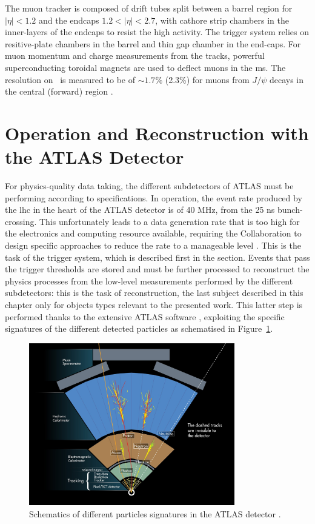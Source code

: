 The muon tracker is composed of drift tubes split between a barrel region for $|\eta| < 1.2$ and the endcaps $1.2 < |\eta| < 2.7$, with cathore strip chambers in the inner-layers of the endcaps to resist the high activity. The trigger system relies on resitive-plate chambers in the barrel and thin gap chamber in the end-caps. For muon momentum and charge measurements from the tracks, powerful superconducting toroidal magnets are used to deflect muons in the \gls{ms}. The resolution on \pt\ is measured to be of $\sim 1.7$\% (2.3\%) for muons from $J/\psi$ decays in the central (forward) region \cite{atlasMuonPTReco}.

\section{Operation and Reconstruction with the ATLAS Detector}
For physics-quality data taking, the different subdetectors of ATLAS must be performing according to specifications. In operation, the event rate produced by the \gls{lhc} in the heart of the ATLAS detector is of 40 MHz, from the 25 ns bunch-crossing. This unfortunately leads to a data generation rate that is too high for the electronics and computing resource available, requiring the Collaboration to design specific approaches to reduce the rate to a manageable level \cite{Nedden_2017}. This is the task of the trigger system, which is described first in the section. Events that pass the trigger thresholds are stored and must be further processed to reconstruct the physics processes from the low-level measurements performed by the different subdetectors: this is the task of reconstruction, the last subject described in this chapter only for objects types relevant to the presented work. This latter step is performed thanks to the extensive ATLAS software \cite{ATL-SOFT-PUB-2021-001, ATL-SOFT-PUB-2020-001}, exploiting the specific signatures of the different detected particles as schematised in Figure~\ref{fig-ATLASdetect}.

\begin{figure}[!h]
  \centering
  \includegraphics[width=0.8\textwidth]{Images/ATLAS/ATLASdetection.jpg}
  \caption{Schematics of different particles signatures in the ATLAS detector \cite{Pequenao:1505342}.}
  \label{fig-ATLASdetect}
\end{figure}


